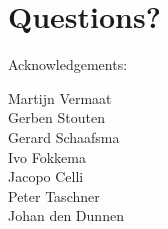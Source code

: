 \documentclass[slidestop]{beamer}
\begin{document}
\section{Questions?}
\lastpagetemplate
\begin{frame}
  \begin{center}
    Acknowledgements:
    \bigskip
    \bigskip

    Martijn Vermaat\\
    Gerben Stouten\\
    Gerard Schaafsma\\
    Ivo Fokkema\\
    Jacopo Celli\\
    Peter Taschner\\
    Johan den Dunnen
    \bigskip
    \bigskip
    \bigskip

  \end{center}
\end{frame}
\end{document}
